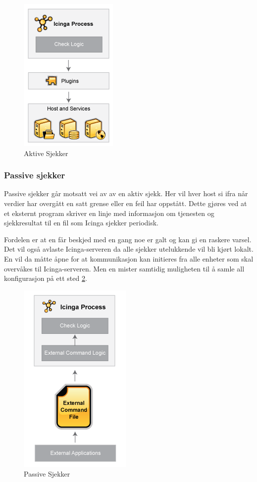 \begin{center}
\begin{figure}
    \includegraphics{img/activechecks.png}
    \caption{Aktive Sjekker}
    \label{active_checks}
\end{figure}
\end{center}

\subsubsection{Passive sjekker}
Passive sjekker går motsatt vei av av en aktiv sjekk. Her vil hver host si ifra når verdier har overgått en satt grense eller en feil har oppstått. Dette gjøres ved at et eksternt program skriver en linje med informasjon om tjenesten og sjekkresultat til en fil som Icinga sjekker periodisk.

Fordelen er at en får beskjed med en gang noe er galt og kan gi en raskere varsel. Det vil også avlaste Icinga-serveren da alle sjekker utelukkende vil bli kjørt lokalt. En vil da måtte åpne for at kommunikasjon kan initieres fra alle enheter som skal overvåkes til Icinga-serveren. Men en mister samtidig muligheten til å samle all konfigurasjon på ett sted \ref{passive_checks}.

\begin{center}
\begin{figure}
    \includegraphics{img/passivechecks.png}
    \caption{Passive Sjekker}
    \label{passive_checks}
\end{figure}
\end{center}

